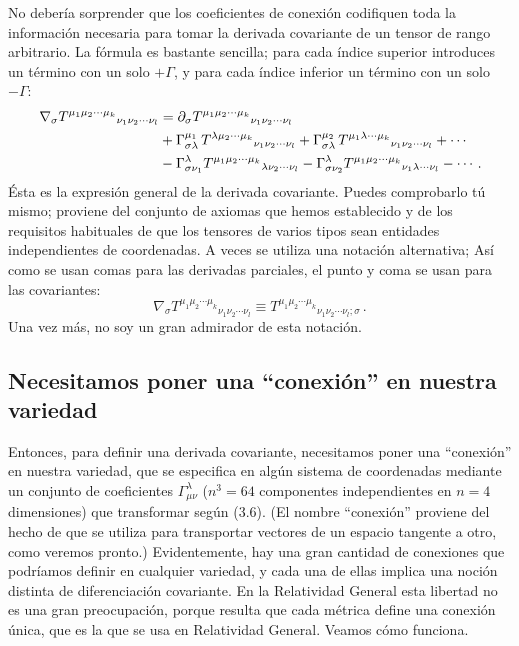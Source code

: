 \documentclass[11pt,b5paper,openany,twoside]{book}
\newcommand{\mn}{{\mu\nu}}
\begin{document}
No debería sorprender que los coeficientes de conexión codifiquen toda la información necesaria para tomar la derivada covariante de un tensor de rango arbitrario.
La fórmula es bastante sencilla; para cada índice superior introduces un término con un solo $+\Gamma$, y para cada índice inferior un término con un solo $-\Gamma$:
\begin{align}
\nabla_\sigma T^{\mu_1 \mu_2 \cdots \mu_k}{}_{\nu_1
\nu_2 \cdots \nu_l} &= \partial_\sigma T^{\mu_1 \mu_2 \cdots
\mu_k}{}_{\nu_1 \nu_2 \cdots \nu_l}  \notag \\
& +\Gamma^{\mu_1}_{\sigma\lambda}\, T^{\lambda \mu_2 \cdots
\mu_k}{}_{\nu_1 \nu_2 \cdots \nu_l}
+\Gamma^{\mu_2}_{\sigma\lambda}\, T^{\mu_1 \lambda \cdots
\mu_k}{}_{\nu_1 \nu_2 \cdots \nu_l} +\cdots \notag \\
& -\Gamma^\lambda_{\sigma\nu_1}T^{\mu_1 \mu_2 \cdots
\mu_k}{}_{\lambda \nu_2 \cdots \nu_l}
-\Gamma^\lambda_{\sigma\nu_2}T^{\mu_1 \mu_2 \cdots \mu_k}{}_{\nu_1
\lambda \cdots \nu_l} - \cdots \,. \label{3.13}
\end{align}
Ésta es la expresión general de la derivada covariante.
Puedes comprobarlo tú mismo; proviene del conjunto de axiomas que hemos establecido y de los requisitos habituales de que los tensores de varios tipos sean entidades independientes de coordenadas.
A veces se utiliza una notación alternativa; Así como se usan comas para las derivadas parciales, el punto y coma se usan para las covariantes:
\begin{equation}
\nabla_\sigma T^{\mu_1 \mu_2 \cdots \mu_k}{}_{\nu_1
\nu_2 \cdots \nu_l} \equiv T^{\mu_1 \mu_2 \cdots \mu_k}{}_{\nu_1
\nu_2 \cdots \nu_l ;\sigma}\,.\label{3.14}
\end{equation}
Una vez más, no soy un gran admirador de esta notación.

\subsection{Necesitamos poner una ``conexión'' en nuestra variedad}

Entonces, para definir una derivada covariante, necesitamos poner una ``conexión'' en nuestra variedad, que se especifica en algún sistema de coordenadas mediante un conjunto de coeficientes $\Gamma^\lambda_\mn$ ($n^3=64$ componentes independientes en $n=4$ dimensiones) que transformar según (3.6).
(El nombre ``conexión'' proviene del hecho de que se utiliza para transportar vectores de un espacio tangente a otro, como veremos pronto.)
Evidentemente, hay una gran cantidad de conexiones que podríamos definir en cualquier variedad, y cada una de ellas implica una noción distinta de diferenciación covariante.
En la Relatividad General esta libertad no es una gran preocupación, porque resulta que cada métrica define una conexión única, que es la que se usa en Relatividad General.
Veamos cómo funciona.
\end{document}
